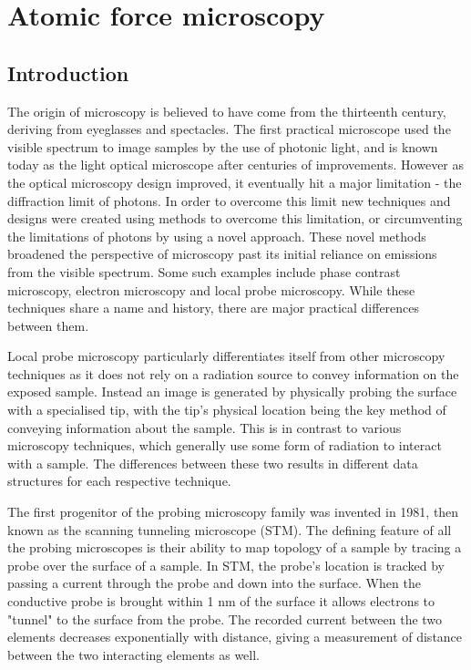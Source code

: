 \chapter{Atomic force microscopy}


\section{Introduction}
The origin of microscopy is believed to have come from the thirteenth century, deriving from eyeglasses and spectacles. The first practical microscope used the visible spectrum to image samples by the use of photonic light, and is known today as the light optical microscope after centuries of improvements. However as the optical microscopy design improved, it eventually hit a major limitation - the diffraction limit of photons. In order to overcome this limit new techniques and designs were created using methods to overcome this limitation, or circumventing the limitations of photons by using a novel approach. These novel methods broadened the perspective of microscopy past its initial reliance on emissions from the visible spectrum. Some such examples include phase contrast microscopy, electron microscopy and local probe microscopy. While these techniques share a name and history, there are major practical differences between them.

Local probe microscopy particularly differentiates itself from other microscopy techniques as it does not rely on a radiation source to convey information on the exposed sample. Instead an image is generated by physically probing the surface with a specialised tip, with the tip's physical location being the key method of conveying information about the sample. This is in contrast to various microscopy techniques, which generally use some form of radiation to interact with a sample. The differences between these two results in different data structures for each respective technique. %

The first progenitor of the probing microscopy family was invented in 1981, then known as the scanning tunneling microscope (STM). The defining feature of all the probing microscopes is their ability to map topology of a sample by tracing a probe over the surface of a sample. In STM, the probe's location is tracked by passing a current through the probe and down into the surface. When the conductive probe is  brought within 1 nm of the surface it allows electrons to "tunnel" to the surface from the probe. The recorded current between the two elements decreases exponentially with distance, giving a measurement of distance between the two interacting elements as well. 

